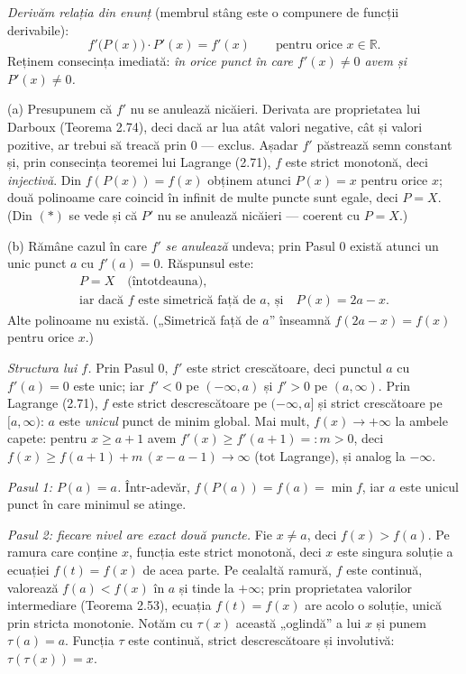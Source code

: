 \emph{Derivăm relația din enunț} (membrul stâng este o compunere de funcții derivabile):
\[ f'\bigl(P(x)\bigr)\cdot P'(x)=f'(x)\qquad\text{pentru orice }x\in\mathbb{R}. \tag{$\ast$} \]
Reținem consecința imediată: \emph{în orice punct în care $f'(x)\neq0$ avem și $P'(x)\neq0$.}

(a) Presupunem că $f'$ nu se anulează nicăieri. Derivata are proprietatea lui Darboux (Teorema 2.74), deci dacă ar lua atât valori negative, cât și valori pozitive, ar trebui să treacă prin $0$ --- exclus. Așadar $f'$ păstrează semn constant și, prin consecința teoremei lui Lagrange (2.71), $f$ este strict monotonă, deci \emph{injectivă}. Din $f(P(x))=f(x)$ obținem atunci $P(x)=x$ pentru orice $x$; două polinoame care coincid în infinit de multe puncte sunt egale, deci $P=X$. (Din $(\ast)$ se vede și că $P'$ nu se anulează nicăieri --- coerent cu $P=X$.)

(b) Rămâne cazul în care $f'$ \emph{se anulează} undeva; prin Pasul 0 există atunci un unic punct $a$ cu $f'(a)=0$. Răspunsul este:
\[ \begin{gathered} P=X\quad\text{(întotdeauna)},\\
\text{iar dacă }f\text{ este simetrică față de }a,\ \text{și}\quad P(x)=2a-x . \end{gathered} \]
Alte polinoame nu există. („Simetrică față de $a$'' înseamnă $f(2a-x)=f(x)$ pentru orice $x$.)

\emph{Structura lui $f$.} Prin Pasul 0, $f'$ este strict crescătoare, deci punctul $a$ cu $f'(a)=0$ este unic; iar $f'<0$ pe $(-\infty,a)$ și $f'>0$ pe $(a,\infty)$. Prin Lagrange (2.71), $f$ este strict descrescătoare pe $(-\infty,a]$ și strict crescătoare pe $[a,\infty)$: $a$ este \emph{unicul} punct de minim global. Mai mult, $f(x)\to+\infty$ la ambele capete: pentru $x\ge a+1$ avem $f'(x)\ge f'(a+1)=:m>0$, deci $f(x)\ge f(a+1)+m\,(x-a-1)\to\infty$ (tot Lagrange), și analog la $-\infty$.

\emph{Pasul 1: $P(a)=a$.} Într-adevăr, $f(P(a))=f(a)=\min f$, iar $a$ este unicul punct în care minimul se atinge.

\emph{Pasul 2: fiecare nivel are exact două puncte.} Fie $x\neq a$, deci $f(x)>f(a)$. Pe ramura care conține $x$, funcția este strict monotonă, deci $x$ este singura soluție a ecuației $f(t)=f(x)$ de acea parte. Pe cealaltă ramură, $f$ este continuă, valorează $f(a)<f(x)$ în $a$ și tinde la $+\infty$; prin proprietatea valorilor intermediare (Teorema 2.53), ecuația $f(t)=f(x)$ are acolo o soluție, unică prin stricta monotonie. Notăm cu $\tau(x)$ această „oglindă'' a lui $x$ și punem $\tau(a)=a$. Funcția $\tau$ este continuă, strict descrescătoare și involutivă: $\tau(\tau(x))=x$.

